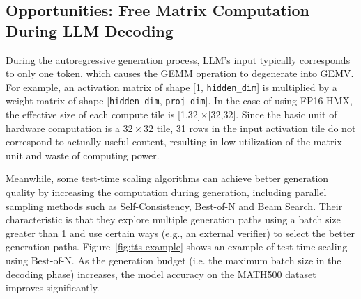 

\subsection{Opportunities: Free Matrix Computation During LLM Decoding}

During the autoregressive generation process, LLM's input typically corresponds to only one token, which causes the GEMM operation to degenerate into GEMV. For example, an activation matrix of shape [1, \texttt{hidden\_dim}] is multiplied by a weight matrix of shape [\texttt{hidden\_dim}, \texttt{proj\_dim}]. In the case of using FP16 HMX, the effective size of each compute tile is [1,32]$\times$[32,32]. Since the basic unit of hardware computation is a $32\times32$ tile, 31 rows in the input activation tile do not correspond to actually useful content, resulting in low utilization of the matrix unit and waste of computing power.

Meanwhile, some test-time scaling algorithms can achieve better generation quality by increasing the computation during generation, including parallel sampling methods such as Self-Consistency, Best-of-N and Beam Search. Their characteristic is that they explore multiple generation paths using a batch size greater than 1 and use certain ways (e.g., an external verifier) to select the better generation paths. Figure~\ref{fig:tts-example} shows an example of test-time scaling using Best-of-N. As the generation budget (i.e. the maximum batch size in the decoding phase) increases, the model accuracy on the MATH500 dataset improves significantly.

